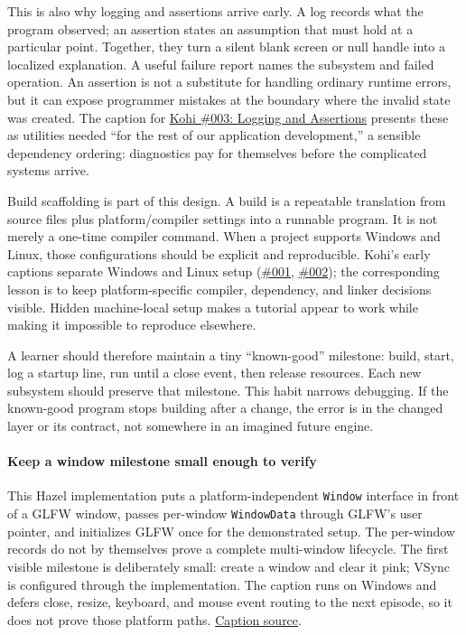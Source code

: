 This is also why logging and assertions arrive early. A log records what the program observed; an assertion states an assumption that must hold at a particular point. Together, they turn a silent blank screen or null handle into a localized explanation. A useful failure report names the subsystem and failed operation. An assertion is not a substitute for handling ordinary runtime errors, but it can expose programmer mistakes at the boundary where the invalid state was created. The caption for \href{https://www.youtube.com/watch?v=l9e8PJskYnI}{Kohi \#003: Logging and Assertions} presents these as utilities needed ``for the rest of our application development,'' a sensible dependency ordering: diagnostics pay for themselves before the complicated systems arrive.

Build scaffolding is part of this design. A build is a repeatable translation from source files plus platform/compiler settings into a runnable program. It is not merely a one-time compiler command. When a project supports Windows and Linux, those configurations should be explicit and reproducible. Kohi's early captions separate Windows and Linux setup (\href{https://www.youtube.com/watch?v=F6_WdnzQIQ4}{\#001}, \href{https://www.youtube.com/watch?v=NIv1mygBOcg}{\#002}); the corresponding lesson is to keep platform-specific compiler, dependency, and linker decisions visible. Hidden machine-local setup makes a tutorial appear to work while making it impossible to reproduce elsewhere.

A learner should therefore maintain a tiny ``known-good'' milestone: build, start, log a startup line, run until a close event, then release resources. Each new subsystem should preserve that milestone. This habit narrows debugging. If the known-good program stops building after a change, the error is in the changed layer or its contract, not somewhere in an imagined future engine.

\paragraph{Keep a window milestone small enough to verify}\label{keep-a-window-milestone-small-enough-to-verify}

This Hazel implementation puts a platform-independent \texttt{Window} interface in front of a GLFW window, passes per-window \texttt{WindowData} through GLFW's user pointer, and initializes GLFW once for the demonstrated setup. The per-window records do not by themselves prove a complete multi-window lifecycle. The first visible milestone is deliberately small: create a window and clear it pink; VSync is configured through the implementation. The caption runs on Windows and defers close, resize, keyboard, and mouse event routing to the next episode, so it does not prove those platform paths. \href{https://www.youtube.com/watch?v=88dmtleVywk}{Caption source}.

